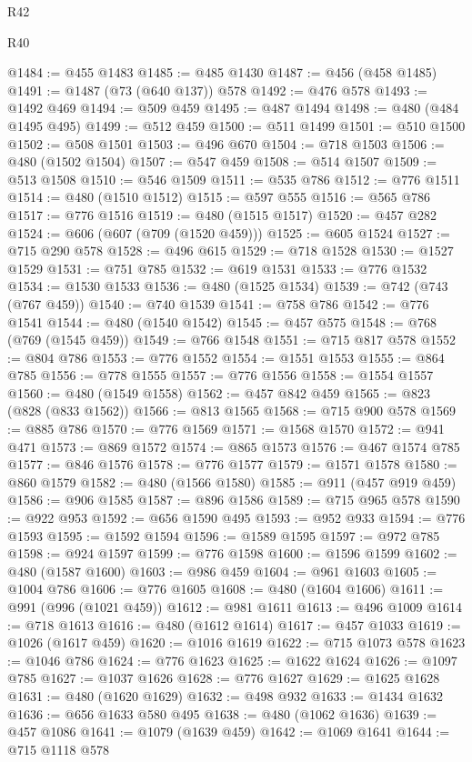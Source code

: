 \begin{lexlean}{R42}
\begin{lexlean}{R40}
\begin{coremodule}
{{{{{{{{{{{{{{{{{{{{{{{{{{{{{{{{{{{{{{{{{{{{{{{{{{{{{{{{{{{{{{{{{{{{{{{{{{{{{{{{{{{{{{{{{{{{{{{{{{{{{{{{{{{{{@1484 := @455 @1483
@1485 := @485 @1430
@1487 := @456 (@458 @1485)
@1491 := @1487 (@73 (@640 @137)) @578
@1492 := @476 @578
@1493 := @1492 @469
@1494 := @509 @459
@1495 := @487 @1494
@1498 := @480 (@484 @1495 @495)
@1499 := @512 @459
@1500 := @511 @1499
@1501 := @510 @1500
@1502 := @508 @1501
@1503 := @496 @670
@1504 := @718 @1503
@1506 := @480 (@1502 @1504)
@1507 := @547 @459
@1508 := @514 @1507
@1509 := @513 @1508
@1510 := @546 @1509
@1511 := @535 @786
@1512 := @776 @1511
@1514 := @480 (@1510 @1512)
@1515 := @597 @555
@1516 := @565 @786
@1517 := @776 @1516
@1519 := @480 (@1515 @1517)
@1520 := @457 @282
@1524 := @606 (@607 (@709 (@1520 @459)))
@1525 := @605 @1524
@1527 := @715 @290 @578
@1528 := @496 @615
@1529 := @718 @1528
@1530 := @1527 @1529
@1531 := @751 @785
@1532 := @619 @1531
@1533 := @776 @1532
@1534 := @1530 @1533
@1536 := @480 (@1525 @1534)
@1539 := @742 (@743 (@767 @459))
@1540 := @740 @1539
@1541 := @758 @786
@1542 := @776 @1541
@1544 := @480 (@1540 @1542)
@1545 := @457 @575
@1548 := @768 (@769 (@1545 @459))
@1549 := @766 @1548
@1551 := @715 @817 @578
@1552 := @804 @786
@1553 := @776 @1552
@1554 := @1551 @1553
@1555 := @864 @785
@1556 := @778 @1555
@1557 := @776 @1556
@1558 := @1554 @1557
@1560 := @480 (@1549 @1558)
@1562 := @457 @842 @459
@1565 := @823 (@828 (@833 @1562))
@1566 := @813 @1565
@1568 := @715 @900 @578
@1569 := @885 @786
@1570 := @776 @1569
@1571 := @1568 @1570
@1572 := @941 @471
@1573 := @869 @1572
@1574 := @865 @1573
@1576 := @467 @1574 @785
@1577 := @846 @1576
@1578 := @776 @1577
@1579 := @1571 @1578
@1580 := @860 @1579
@1582 := @480 (@1566 @1580)
@1585 := @911 (@457 @919 @459)
@1586 := @906 @1585
@1587 := @896 @1586
@1589 := @715 @965 @578
@1590 := @922 @953
@1592 := @656 @1590 @495
@1593 := @952 @933
@1594 := @776 @1593
@1595 := @1592 @1594
@1596 := @1589 @1595
@1597 := @972 @785
@1598 := @924 @1597
@1599 := @776 @1598
@1600 := @1596 @1599
@1602 := @480 (@1587 @1600)
@1603 := @986 @459
@1604 := @961 @1603
@1605 := @1004 @786
@1606 := @776 @1605
@1608 := @480 (@1604 @1606)
@1611 := @991 (@996 (@1021 @459))
@1612 := @981 @1611
@1613 := @496 @1009
@1614 := @718 @1613
@1616 := @480 (@1612 @1614)
@1617 := @457 @1033
@1619 := @1026 (@1617 @459)
@1620 := @1016 @1619
@1622 := @715 @1073 @578
@1623 := @1046 @786
@1624 := @776 @1623
@1625 := @1622 @1624
@1626 := @1097 @785
@1627 := @1037 @1626
@1628 := @776 @1627
@1629 := @1625 @1628
@1631 := @480 (@1620 @1629)
@1632 := @498 @932
@1633 := @1434 @1632
@1636 := @656 @1633 @580 @495
@1638 := @480 (@1062 @1636)
@1639 := @457 @1086
@1641 := @1079 (@1639 @459)
@1642 := @1069 @1641
@1644 := @715 @1118 @578
}}}}}}}}}}}}}}}}}}}}}}}}}}}}}}}}}}}}}}}}}}}}}}}}}}}}}}}}}}}}}}}}}}}}}}}}}}}}}}}}}}}}}}}}}}}}}}}}}}}}}}}}}}}}}
\end{coremodule}
\end{lexlean}
\end{lexlean}
